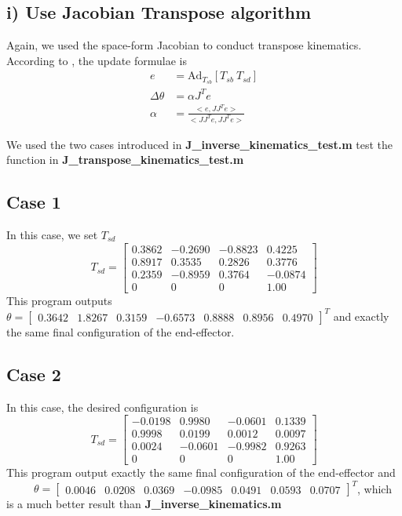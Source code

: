 \documentclass[english,10pt,a4paper]{article}
\begin{document}
    \subsection*{i) Use Jacobian Transpose algorithm}
    Again, we used the space-form Jacobian to conduct transpose kinematics. According to \cite{ik}, the update formulae is 
    \begin{align}
        e &= \text{Ad}_{T_{sb}} [T_{sb} \ T_{sd}]\\ \nonumber
        \Delta\theta &= \alpha J^T e \\
        \alpha &= \frac{<e, JJ^Te>}{<JJ^Te, JJ^Te>}
    \end{align}
    
    We used the two cases introduced in \textbf{J\_inverse\_kinematics\_test.m} test the function in \textbf{J\_transpose\_kinematics\_test.m}
    \subsection*{Case 1}
    In this case, we set $T_{sd}$
    \begin{equation}
        T_{sd} = \begin{bmatrix}
            0.3862 & -0.2690 & -0.8823 & 0.4225\\
            0.8917 & 0.3535 & 0.2826 & 0.3776\\
            0.2359 & -0.8959 & 0.3764 &  -0.0874\\
            0 & 0 & 0 & 1.00
        \end{bmatrix}
    \end{equation}
    This program outputs \(\theta = \begin{bmatrix} 0.3642 & 1.8267 & 0.3159 & -0.6573 & 0.8888 & 0.8956 & 0.4970 \end{bmatrix}^T\) and exactly the same final configuration of the end-effector.

    \subsection*{Case 2}
    In this case, the desired configuration is
    \begin{equation}
        T_{sd} = \begin{bmatrix}
            -0.0198 & 0.9980 & -0.0601 & 0.1339\\
            0.9998 & 0.0199 & 0.0012 & 0.0097\\
            0.0024 & -0.0601 & -0.9982 & 0.9263\\
            0 & 0 & 0 & 1.00
        \end{bmatrix}
    \end{equation}
    This program output exactly the same final configuration of the end-effector and \ \ \ \ \ \(\theta = \begin{bmatrix} 0.0046 & 0.0208 & 0.0369 & -0.0985 & 0.0491 & 0.0593 & 0.0707 \end{bmatrix}^T\), which is a much better result than \textbf{J\_inverse\_kinematics.m}
    
\end{document}
